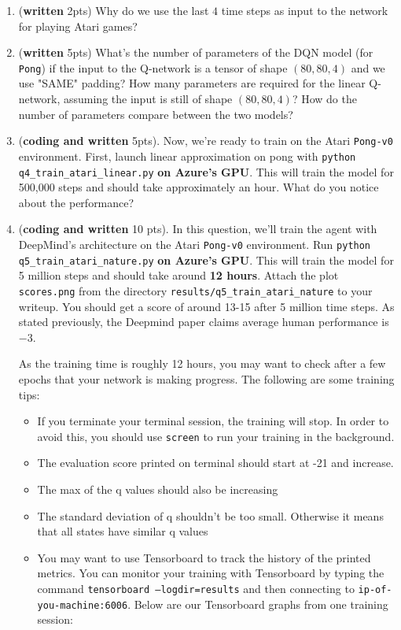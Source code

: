 \documentclass{article}
\newenvironment{myitemize}
{ \begin{itemize}
		\setlength{\itemsep}{0pt}
		\setlength{\parskip}{0pt}
		\setlength{\parsep}{0pt}     }
	{ \end{itemize}                  }
\begin{document}
\begin{enumerate}
\item (\textbf{written} 2pts) Why do we use the last $ 4 $ time steps as input to the network for playing Atari games?   

\item (\textbf{written} 5pts) What's the number of parameters of the DQN model (for \texttt{Pong}) if the input to the Q-network is a tensor of shape $ (80, 80, 4) $ and we use "SAME" padding? How many parameters are required for the linear Q-network, assuming the input is still of shape $(80, 80, 4)$?  How do the number of parameters compare between the two models?

\item (\textbf{coding and written} 5pts). Now, we're ready to train on the Atari \texttt{Pong-v0} environment. First, launch linear approximation on pong with \texttt{python q4\_train\_atari\_linear.py} \textbf{on Azure's GPU}. This will train the model for 500,000 steps and should take approximately an hour.  What do you notice about the performance?

\item (\textbf{coding and written} 10 pts). In this question, we'll train the agent with DeepMind's architecture on the Atari \texttt{Pong-v0} environment. Run \texttt{python q5\_train\_atari\_nature.py} \textbf{on Azure's GPU}.  This will train the model for 5 million steps and should take around \textbf{12 hours}.  Attach the plot \texttt{scores.png} from the directory \texttt{results/q5\_train\_atari\_nature} to your writeup. 
You should get a score of around 13-15 after 5 million time steps.  As stated previously, the Deepmind paper claims average human performance is $ -3 $.


As the training time is roughly 12 hours, you may want to check after a few epochs that your network is making progress.  The following are some training tips:

\begin{myitemize}
\item If you terminate your terminal session, the training will stop.  In order to avoid this, you should use \texttt{screen} to run your training in the background.
\item The evaluation score printed on terminal should start at -21 and increase.
\item The max of the q values should also be increasing
\item The standard deviation of q shouldn't be too small. Otherwise it means that all states have similar q values
\item You may want to use Tensorboard to track the history of the printed metrics. You can monitor your training with Tensorboard by typing the command \texttt{tensorboard --logdir=results} and then connecting to \texttt{ip-of-you-machine:6006}.  Below are our Tensorboard graphs from one training session:
\end{myitemize}


\end{enumerate}
\end{document}
